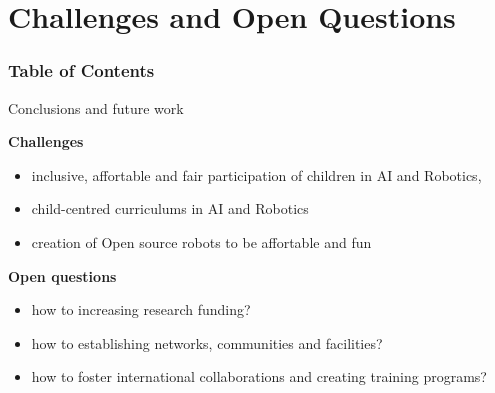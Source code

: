 \section{Challenges and Open Questions}


\begin{frame}
      \frametitle{Table of Contents}
      \tableofcontents[currentsection]
\end{frame}



{
\begin{frame}{Conclusions and future work}

\textbf{Challenges}   

\begin{itemize}
\item inclusive, affortable and fair participation of children in AI and Robotics,
\item child-centred curriculums in AI and Robotics 
\item creation of Open source robots to be affortable and fun 
\end{itemize}

\textbf{Open questions}
\begin{itemize}
\item how to increasing research funding?
\item how to establishing networks, communities and facilities?
\item how to foster international collaborations and creating training programs?
\end{itemize}




\end{frame}
}


